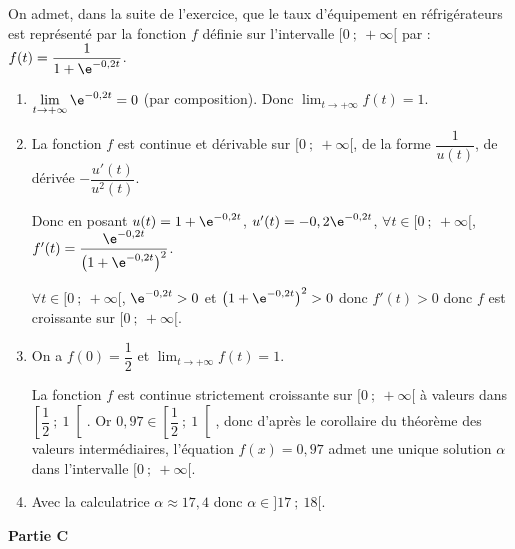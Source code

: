 \medskip

On admet, dans la suite de l'exercice, que le taux d'équipement en réfrigérateurs est représenté par la fonction $f$ définie sur l'intervalle $[0~;~+\infty[$ par : $f(t) = \dfrac{1}{1+ \e^{-0,2t}}$.

\begin{enumerate}
	\item $\displaystyle\lim_{t \to + \infty} \e^{-0,2t} = 0$ (par composition). Donc $\displaystyle\lim_{t \to + \infty} f(t)=1$.
	\item La fonction $f$ est continue et dérivable sur $[0~;~+\infty[$, de la forme $\dfrac{1}{u(t)}$, de dérivée $-\dfrac{u'(t)}{u^2(t)}$.

Donc en posant $u(t)=1+ \e^{-0,2t}$, $u'(t)=-0,2\e^{-0,2t}$, $\forall t \in [0~;~+\infty[$, $f'(t)=\dfrac{\e^{-0,2t}}{\left(1+ \e^{-0,2t}\right)^2}$.

$\forall t \in [0~;~+\infty[$, $\e^{-0,2t}>0$ et $\left(1+ \e^{-0,2t}\right)^2>0$ donc $f'(t) > 0$ donc $f$ est croissante sur $[0~;~+\infty[$.
	\item On a $f(0)= \dfrac{1}{2}$ et $\displaystyle\lim_{t \to + \infty} f(t)=1$.

La fonction $f$ est continue strictement croissante sur $[0~;~+\infty[$ à valeurs dans $\left[\dfrac{1}{2}~;~1\right[$. Or $0,97 \in \left[\dfrac{1}{2}~;~1\right[$, donc d'après le corollaire du théorème des valeurs intermédiaires, l'équation $f(x) = 0,97$ admet une unique solution $\alpha$ dans l'intervalle  $[0~;~+\infty[$.
	\item Avec la calculatrice $\alpha \approx 17,4$ donc $\alpha \in ]17~;~18[$.
\end{enumerate}

\medskip

\textbf{Partie C}

\medskip

